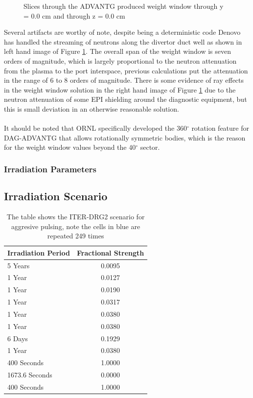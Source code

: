 \documentclass[12pt]{article}
\begin{document}
\begin{figure}[ht!]
  \caption{Slices through the ADVANTG produced weight window through y = 0.0 cm
  and through z = 0.0 cm}
  \label{fig:wwinp}
\end{figure}
Several artifacts are worthy of note, despite being a deterministic code Denovo
has handled the streaming of neutrons along the divertor duct well as shown in
left hand image of Figure \ref{fig:wwinp}. The overall span of the weight window
is seven orders of magnitude, which is largely proportional to the neutron
attenuation from the plasma to the port interspace, previous calculations put
the attenuation in the range of 6 to 8 orders of magnitude. There is some
evidence of ray effects in the weight window solution in the right hand image
of Figure \ref{fig:wwinp} due to the neutron attenuation of some EPI shielding
around the diagnostic equipment, but this is small deviation in an otherwise
reasonable solution.
\\
\\
It should be noted that ORNL specifically developed the 360$^{\circ}$ rotation
feature for DAG-ADVANTG that allows rotationally symmetric bodies, which is the
reason for the weight window values beyond the 40$^{\circ}$ sector.
\subsubsection{Irradiation Parameters}
\subsection{Irradiation Scenario}
\begin{table}[ht!]
   \begin{tabular}{| l | c |}
      \hline 
      Irradiation Period & Fractional Strength \\
      \hline
      5 Years & 0.0095 \\
      1 Year  & 0.0127 \\
      1 Year  & 0.0190 \\
      1 Year  & 0.0317 \\
      1 Year  & 0.0380 \\
      1 Year  & 0.0380 \\
      6 Days  & 0.1929 \\
      1 Year  & 0.0380 \\
      \cellcolor{blue!25} 400 Seconds & 1.0000 \\
      \cellcolor{blue!25}1673.6 Seconds & 0.0000 \\
      400 Seconds & 1.0000 \\
      \hline
\end{tabular}
\caption{The table shows the ITER-DRG2 scenario for aggresive pulsing, note the
         cells in \textcolor{blue!25}{blue} are repeated 249 times}
\label{tag:irrad_scenario}
\end{table}
\end{document}

